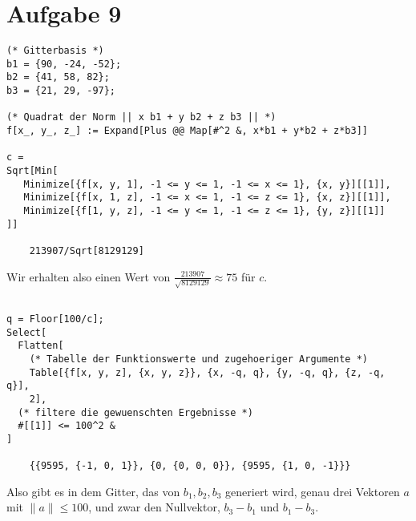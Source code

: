 \section*{Aufgabe 9}
\begin{lstlisting}
(* Gitterbasis *)
b1 = {90, -24, -52};
b2 = {41, 58, 82};
b3 = {21, 29, -97};

(* Quadrat der Norm || x b1 + y b2 + z b3 || *)
f[x_, y_, z_] := Expand[Plus @@ Map[#^2 &, x*b1 + y*b2 + z*b3]]

c =
Sqrt[Min[
   Minimize[{f[x, y, 1], -1 <= y <= 1, -1 <= x <= 1}, {x, y}][[1]], 
   Minimize[{f[x, 1, z], -1 <= x <= 1, -1 <= z <= 1}, {x, z}][[1]], 
   Minimize[{f[1, y, z], -1 <= y <= 1, -1 <= z <= 1}, {y, z}][[1]]
]]

	213907/Sqrt[8129129]
\end{lstlisting}

Wir erhalten also einen Wert von $\frac{213907}{\sqrt{8129129}} \approx 75$ für $c$.

\begin{lstlisting}

q = Floor[100/c];
Select[
  Flatten[
    (* Tabelle der Funktionswerte und zugehoeriger Argumente *)
    Table[{f[x, y, z], {x, y, z}}, {x, -q, q}, {y, -q, q}, {z, -q, q}],
    2],
  (* filtere die gewuenschten Ergebnisse *)
  #[[1]] <= 100^2 & 
]

	{{9595, {-1, 0, 1}}, {0, {0, 0, 0}}, {9595, {1, 0, -1}}}
\end{lstlisting}
Also gibt es in dem Gitter, das von $b_1, b_2, b_3$ generiert wird, genau drei
Vektoren $a$ mit $\|a\| \leq 100$, und zwar den Nullvektor, $b_3 - b_1$ und
$b_1 - b_3$.\\[0.8em]

